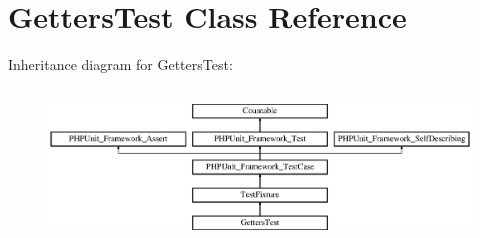 \section{Getters\+Test Class Reference}
\label{class_getters_test}
Inheritance diagram for Getters\+Test\+:\begin{figure}[H]
\begin{center}
\leavevmode
\includegraphics[height=4.129793cm]{class_getters_test}
\end{center}
\end{figure}
